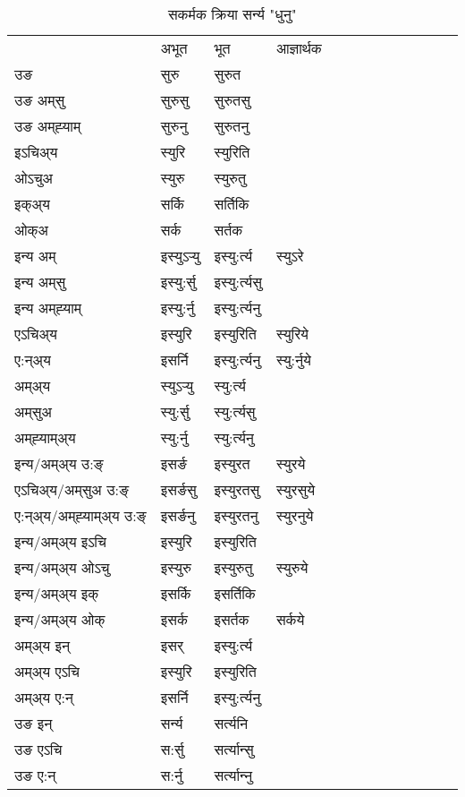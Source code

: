 \begin{table}[H]
\centering
\caption{\label{ur.vt} सकर्मक क्रिया  सर्न्य  "धुनु"  }
\begin{tabular}{l|l|l|l|l|l|l|l|l|l|l|l|l}  \toprule
&अभूत & भूत & आज्ञार्थक \\ 
उङ &सुरु &सुरुत \\ 
उङ अम्‌सु &सुरुसु &सुरुतसु \\ 
उङ अम्‌ह्‍याम् &सुरुनु &सुरुतनु \\ 
इऽचिअ्य &स्युरि &स्युरिति   \\ 
ओऽचुअ &स्युरु &स्युरुतु   \\ 
इक्अ्य &सर्कि &सर्तिकि   \\ 
ओक्अ &सर्क &सर्तक   \\ 
इन्य अम् & इस्युऽर्‍यु  & इस्यु:र्त्य &स्युऽरे  \\ 
इन्य अम्‌सु & इस्यु:र्सु  & इस्यु:र्त्यसु   \\ 
इन्य अम्‌ह्‍याम् & इस्यु:र्नु  & इस्यु:र्त्यनु   \\ 
एऽचिअ्य & इस्युरि & इस्युरिति &स्युरिये    \\ 
ए:न्अ्य & इसर्नि  & इस्यु:र्त्यनु &स्यु:र्नुये  \\ 
अम्अ्य & स्युऽर्‍यु  & स्यु:र्त्य  \\ 
अम्‌सुअ & स्यु:र्सु & स्यु:र्त्यसु  \\ 
अम्‌ह्‍याम्अ्य & स्यु:र्नु  & स्यु:र्त्यनु \\ 
\midrule
इन्य/अम्अ्य उ:ङ्‌&इसर्ङ & इस्युरत &स्युरये \\ 
एऽचिअ्य/अम्‌सुअ उ:ङ्‌ &इसर्ङसु & इस्युरतसु &स्युरसुये \\ 
ए:न्अ्य/अम्‌ह्‍याम्अ्य उ:ङ्‌ &इसर्ङनु & इस्युरतनु &स्युरनुये \\ 
इन्य/अम्अ्य इऽचि & इस्युरि & इस्युरिति    \\ 
इन्य/अम्अ्य ओऽचु & इस्युरु & इस्युरुतु  &स्युरुये  \\ 
इन्य/अम्अ्य इक् & इसर्कि & इसर्तिकि   \\ 
इन्य/अम्अ्य ओक् & इसर्क & इसर्तक  &सर्कये  \\ 
अम्अ्य इन् & इसर् & इस्यु:र्त्य   \\ 
अम्अ्य एऽचि & इस्युरि & इस्युरिति    \\ 
अम्अ्य ए:न् & इसर्नि  & इस्यु:र्त्यनु  \\ 
\midrule
उङ इन् & सर्न्य  & सर्त्यनि  \\ 
उङ एऽचि & स:र्सु  & सर्त्यान्सु   \\ 
उङ ए:न्& स:र्नु  & सर्त्यान्‍नु   \\ 
\bottomrule
\end{tabular}
\end{table}


